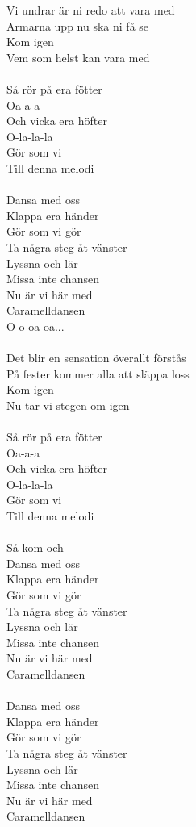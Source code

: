 \vspace{10pt}
Vi undrar är ni redo att vara med\\
Armarna upp nu ska ni få se\\
Kom igen\\
Vem som helst kan vara med\\
\\
Så rör på era fötter\\
Oa-a-a\\
Och vicka era höfter\\
O-la-la-la\\
Gör som vi\\
Till denna melodi\\
\\
Dansa med oss\\
Klappa era händer\\
Gör som vi gör\\
Ta några steg åt vänster\\
Lyssna och lär\\
Missa inte chansen\\
Nu är vi här med\\
Caramelldansen\\
O-o-oa-oa...\\
\\
Det blir en sensation överallt förstås\\
På fester kommer alla att släppa loss\\
Kom igen\\
Nu tar vi stegen om igen\\
\\
Så rör på era fötter\\
Oa-a-a\\
Och vicka era höfter\\
O-la-la-la\\
Gör som vi\\
Till denna melodi\\
\\
\revrpt Så kom och\\
Dansa med oss\\
Klappa era händer\\
Gör som vi gör\\
Ta några steg åt vänster\\
Lyssna och lär\\
Missa inte chansen\\
Nu är vi här med\\
Caramelldansen\\
\\
Dansa med oss\\
Klappa era händer\\
Gör som vi gör\\
Ta några steg åt vänster\\
Lyssna och lär\\
Missa inte chansen\\
Nu är vi här med\\
Caramelldansen\rpt
